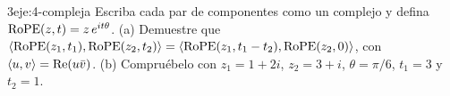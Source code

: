 \begin{ejercicio}{3}{eje:4-compleja}
Escriba cada par de componentes como un complejo y defina $\operatorname{RoPE}(z,t)=z\,e^{it\theta}$. (a) Demuestre que $\langle\operatorname{RoPE}(z_1,t_1),\operatorname{RoPE}(z_2,t_2)\rangle=\langle\operatorname{RoPE}(z_1,t_1-t_2),\operatorname{RoPE}(z_2,0)\rangle$, con $\langle u,v\rangle=\operatorname{Re}(u\bar v)$. (b) Compruébelo con $z_1=1+2i$, $z_2=3+i$, $\theta=\pi/6$, $t_1=3$ y $t_2=1$.
\end{ejercicio}
